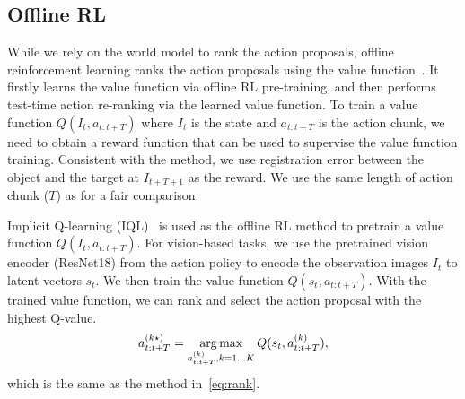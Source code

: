 
\subsection{Offline RL}
\label{app:app_offlineRL}
While we rely on the world model to rank the action proposals, offline reinforcement learning ranks the action proposals using the value function~\cite{nakamoto2024steering}. It firstly learns the value function via offline RL pre-training, and then performs test-time action re-ranking via the learned value function. To train a value function $Q(I_t,a_{t:t+T})$ where $I_t$ is the state and $a_{t:t+T}$ is the action chunk, we need to obtain a reward function that can be used to supervise the value function training. Consistent with the \gpcrank method, we use registration error between the object and the target at $I_{t+T+1}$ as the reward. We use the same length of action chunk ($T$) as \gpcrank for a fair comparison. 

Implicit Q-learning (IQL)~\cite{kostrikov2021offline} is used as the offline RL method to pretrain a value function $Q(I_t,a_{t:t+T})$. For vision-based tasks, we use the pretrained vision encoder (ResNet18) from the action policy to encode the observation images $I_t$ to latent vectors $s_t$. We then train the value function $Q(s_t,a_{t:t+T})$. With the trained value function, we can rank and select the action proposal with the highest Q-value.
\begin{equation}
a_{t:t+T}^{(k\star)} = \operatorname*{arg\,max}_{a_{t:t+T}^{(k)}, k=1 \ldots K} Q(s_t,a_{t:t+T}^{(k)}),
\end{equation}
which is the same as the \gpcrank method in~\eqref{eq:rank}.


